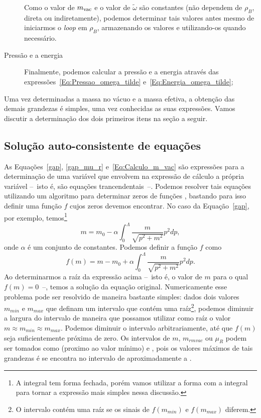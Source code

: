 \begin{description}
\begin{description}
		\end{description}	
		Como o valor de $m_{\rm{vac}}$ e o valor de $\tilde\omega$ são constantes (não dependem de $\rho_B$, direta ou indiretamente), podemos determinar tais valores antes mesmo de iniciarmos o \emph{loop} em $\rho_B$, armazenando os valores e utilizando-os quando necessário.
	\item[Pressão e a energia] Finalmente, podemos calcular a pressão e a energia através das expressões~\eqref{Eq:Pressao_omega_tilde} e~\eqref{Eq:Energia_omega_tilde};
\end{description}
%
Uma vez determinadas a massa no vácuo e a massa efetiva, a obtenção das demais grandezas é simples, uma vez conhecidas as suas expressões. Vamos discutir a determinação dos dois primeiros itens na seção a seguir. 

\subsection{Solução auto-consistente de equações}

As Equações~\eqref{gap}, \eqref{gap_mu_r} e~\eqref{Eq:Calculo_m_vac} são expressões para a determinação de uma variável que envolvem na expressão de cálculo a própria variável --~isto é, são equações trancendentais~--. Podemos resolver tais equações utilizando um algoritmo para determinar zeros de funções \parencite{NumericalRecipes}, bastando para isso definir uma função $f$ cujos zeros devemos encontrar. No caso da Equação~\eqref{gap}, por exemplo, temos\footnote{A integral tem forma fechada, porém vamos utilizar a forma com a integral para tornar a expressão mais simples nessa discussão.}
\begin{equation}
	m = m_0 - \alpha\int_0^\Lambda \frac{m}{\sqrt{p^2 + m^2}} p^2 dp,
\end{equation}
%
onde $\alpha$ é um conjunto de constantes. Podemos definir a função $f$ como
\begin{equation}
	f(m) = m - m_0 + \alpha\int_0^\Lambda \frac{m}{\sqrt{p^2 + m^2}} p^2 dp.
\end{equation}
%
Ao determinarmos a raíz da expressão acima --~isto é, o valor de $m$ para o qual $f(m) = 0$~--, temos a solução da equação original. Numericamente esse problema pode ser resolvido de maneira bastante simples: dados dois valores $m_{min}$ e $m_{max}$ que definam um intervalo que contém uma raíz\footnote{O intervalo contém uma raíz se os sinais de $f(m_{min})$ e $f(m_{max})$ diferem.}, podemos diminuir a largura do intervalo de maneira que possamos utilizar como raíz o valor $m \approx m_{min} \approx m_{max}$. Podemos diminuir o intervalo arbitrariamente, até que $f(m)$ seja suficientemente próxima de zero. Os intervalos de $m$, $m_{rm{vac}}$ ou $\mu_R$ podem ser tomados como  (proximo ao valor mínimo) e , pois os valores máximos de tais grandezas é se encontra no intervalo de aproximadamente  a .

